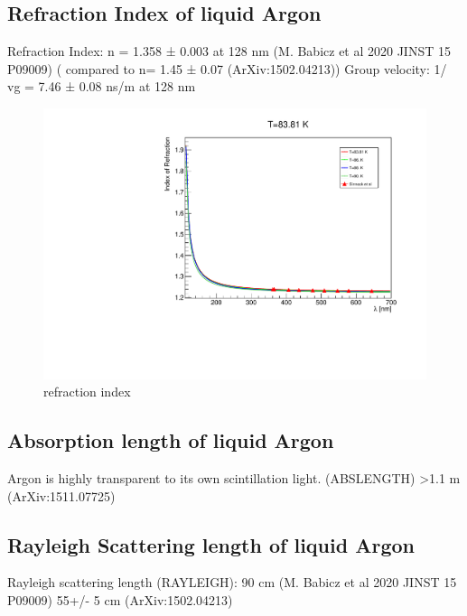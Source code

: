 \documentclass[a4paper]{jpconf}
\begin{document}
\subsection{Refraction Index of liquid Argon}
Refraction Index: n = 1.358 ± 0.003 at 128 nm (M. Babicz et al 2020 JINST 15 P09009)
                            ( compared to n= 1.45 ± 0.07 (ArXiv:1502.04213))
Group velocity: 1/ vg = 7.46 ± 0.08 ns/m at 128 nm
\begin{figure}[ht]
\begin{center}
\includegraphics[width=35.5pc]{sellmeier.pdf}
\end{center}
\caption{\label{fig:sellmeier.pdf}refraction index}
\end{figure}

\subsection{Absorption length of liquid Argon}
Argon is highly transparent to its own scintillation light. (ABSLENGTH)
  >1.1 m (ArXiv:1511.07725) 
  \subsection{Rayleigh Scattering length of liquid Argon}
  Rayleigh scattering length (RAYLEIGH): 90 cm (M. Babicz et al 2020 JINST 15 P09009)
  55+/- 5 cm (ArXiv:1502.04213)
\end{document}
